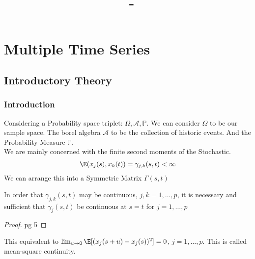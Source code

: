 \documentclass[answers,12pt,addpoints]{exam}
\author{\name}
\title{\course \ - \assignment}
\begin{document}
\maketitle
\tableofcontents
\newpage
\section{Multiple Time Series}
\subsection{Introductory Theory}
\subsubsection{Introduction}
Considering a Probability space triplet: $\Omega, \mathscr{A}, \mathbb{P}$. We can consider $\Omega$ to be our sample space. The borel algebra $\mathscr{A}$ to be the collection of historic events. And the Probability Measure $\mathbb{P}$.\\
We are mainly concerned with the finite second moments of the Stochastic. 
\begin{align*}
	\E(x_j(s), x_k(t)) = \gamma_{j,k}(s,t) < \infty
\end{align*}
We can arrange this into a Symmetric Matrix $\Gamma(s,t)$
\begin{theorem}
    In order that $\gamma_{j,k}(s,t)$ may be continuous, $j,k = 1, \dots, p$, it is necessary and sufficient that $\gamma_j(s,t)$ be continuous at $s=t$ for $j =1, \dots, p$
    \begin{proof}
        pg 5
    \end{proof}
\end{theorem}
This equivalent to $\lim_{u \to 0} \E[(x_j(s+u)-x_j(s))^2] = 0$, $j = 1, \dots, p$. This is called mean-square continuity.
\end{document}
